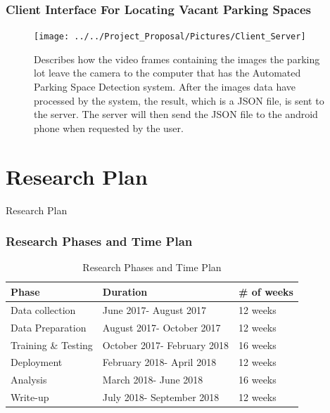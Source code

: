 \documentclass{beamer}
\begin{document}
\begin{frame}[allowframebreaks]
\frametitle{Client Interface For Locating Vacant Parking Spaces}

\begin{figure}
	\centering
	\texttt{[image: ../../Project\_Proposal/Pictures/Client\_Server]}
	\caption{Describes how the video frames containing the images the parking lot leave the camera to the computer that has the Automated Parking Space Detection system. After the images data have processed by the system, the result, which is a JSON file, is sent to the server. The server will then send the JSON file to the android phone when requested by the user.}
	\label{fig:clientserver}
\end{figure}


\end{frame}



\section{Research Plan}

\begin{frame}
\Huge Research Plan
\end{frame}

\begin{frame}
\frametitle{Research Phases and Time Plan}

\begin{table}[h!]
	\centering
	\begin{center}
		\begin{tabular}{ | l | l | l |}
			\hline
			\textbf{Phase} & \textbf{Duration} & \textbf{\# of weeks} \\ \hline
			Data collection & June 2017- August 2017 & 12 weeks \\ \hline
			Data Preparation & August 2017- October 2017 & 12 weeks \\ \hline
			Training \& Testing & October 2017- February 2018 & 16 weeks \\ \hline
			Deployment & February 2018- April 2018 & 12 weeks \\ \hline
			Analysis & March 2018- June 2018 & 16 weeks \\ \hline			
			Write-up & July 2018- September 2018 & 12 weeks \\ \hline
			
		\end{tabular}
	\end{center}
	\caption{Research Phases and Time Plan}
	\label{timeplan}
\end{table}

\end{frame}
\end{document}
